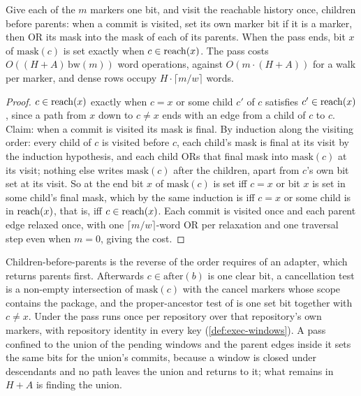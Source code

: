 \begin{proposition}
\label{prop:marker-pass}
Give each of the $m$ markers one bit, and visit the reachable history once,
children before parents: when a commit is visited, set its own marker bit if
it is a marker, then OR its mask into the mask of each of its parents. When
the pass ends, bit $x$ of $\mathrm{mask}(c)$ is set exactly when $c \in
\mathrm{reach}(x)$. The pass costs $O((H + A)\,\mathrm{bw}(m))$ word operations, against
$O(m \cdot (H + A))$ for a walk per marker, and dense rows occupy $H \cdot
\lceil m / w \rceil$ words.
\end{proposition}

\begin{proof}
$c \in \mathrm{reach}(x)$ exactly when $c = x$ or some child $c'$ of $c$ satisfies $c'
\in \mathrm{reach}(x)$, since a path from $x$ down to $c \ne x$ ends with an edge from a
child of $c$ to $c$. Claim: when a commit is visited its mask is final. By
induction along the visiting order: every child of $c$ is visited before $c$,
each child's mask is final at its visit by the induction hypothesis, and each
child ORs that final mask into $\mathrm{mask}(c)$ at its visit; nothing else
writes $\mathrm{mask}(c)$ after the children, apart from $c$'s own bit set at
its visit. So at the end bit $x$ of $\mathrm{mask}(c)$ is set iff $c = x$ or
bit $x$ is set in some child's final mask, which by the same induction is iff
$c = x$ or some child is in $\mathrm{reach}(x)$, that is, iff $c \in \mathrm{reach}(x)$. Each
commit is visited once and each parent edge relaxed once, with one
$\lceil m / w \rceil$-word OR per relaxation and one traversal step even when
$m = 0$, giving the cost.
\end{proof}

Children-before-parents is the reverse of the order  requires of an
adapter, which returns parents first. Afterwards $c \in \mathrm{after}(b)$ is
one clear bit, a cancellation test is a non-empty intersection of
$\mathrm{mask}(c)$ with the cancel markers whose scope contains the package,
and the proper-ancestor test of  is one set bit together with $c
\ne x$. Under  the pass runs once per repository over that
repository's own markers, with repository identity in every key
(\cref{def:exec-windows}). A pass confined to the union of the pending windows
and the parent edges inside it sets the same bits for the union's commits,
because a window is closed under descendants and no path leaves the union and
returns to it; what remains in $H + A$ is finding the union.

